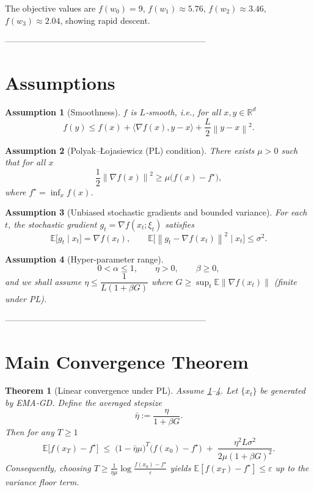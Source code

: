 \documentclass{article}
\newtheorem{assumption}{Assumption}
\newtheorem{theorem}{Theorem}
\newcommand{\EE}{\mathbb{E}}
\newcommand{\norm}[1]{\left\lVert #1\right\rVert}
\newcommand{\grad}{\nabla}
\begin{document}
The objective values are $f(w_{0})=9$, $f(w_{1})\approx5.76$, $f(w_{2})\approx3.46$, $f(w_{3})\approx2.04$, showing rapid descent.

-----------------------------------------------------------------------

\section*{Assumptions}
\begin{assumption}[Smoothness]\label{ass:smooth}
$f$ is $L$‑smooth, i.e., for all $x,y\in\mathbb{R}^{d}$
\[
    f(y)\le f(x)+\langle\grad f(x),y-x\rangle+\frac{L}{2}\norm{y-x}^{2}.
\]
\end{assumption}

\begin{assumption}[Polyak–Łojasiewicz (PL) condition]\label{ass:pl}
There exists $\mu>0$ such that for all $x$
\[
    \frac{1}{2}\norm{\grad f(x)}^{2}\ge \mu\bigl(f(x)-f^{\star}\bigr),
\]
where $f^{\star}= \inf_{x}f(x)$.
\end{assumption}

\begin{assumption}[Unbiased stochastic gradients and bounded variance]\label{ass:stoch}
For each $t$, the stochastic gradient $g_{t}= \grad f(x_{t};\xi_{t})$ satisfies
\[
    \EE\!\bigl[g_{t}\mid x_{t}\bigr]=\grad f(x_{t}),\qquad
    \EE\!\bigl[\norm{g_{t}-\grad f(x_{t})}^{2}\mid x_{t}\bigr]\le\sigma^{2}.
\]
\end{assumption}

\begin{assumption}[Hyper‑parameter range]\label{ass:hyper}
\[
    0<\alpha\le 1,\qquad \eta>0,\qquad \beta\ge 0,
\]
and we shall assume $\eta\le \dfrac{1}{L(1+\beta G)}$ where $G\ge \sup_{t}\EE\norm{\grad f(x_{t})}$ (finite under PL).
\end{assumption}

-----------------------------------------------------------------------

\section*{Main Convergence Theorem}
\begin{theorem}[Linear convergence under PL]\label{thm:linear}
Assume \ref{ass:smooth}–\ref{ass:hyper}. Let $\{x_{t}\}$ be generated by EMA‑GD. Define the averaged stepsize
\[
    \bar\eta:=\frac{\eta}{1+\beta G}.
\]
Then for any $T\ge 1$
\[
    \EE\!\bigl[f(x_{T})-f^{\star}\bigr]\;\le\;
    \bigl(1-\bar\eta\mu\bigr)^{T}\bigl(f(x_{0})-f^{\star}\bigr)
    \;+\;
    \frac{\eta^{2}L\sigma^{2}}{2\mu(1+\beta G)^{2}}.
\tag{1}
\]
Consequently, choosing $T\ge \frac{1}{\bar\eta\mu}\log\frac{f(x_{0})-f^{\star}}{\varepsilon}$ yields $\EE[f(x_{T})-f^{\star}]\le\varepsilon$ up to the variance floor term.
\end{theorem}
\end{document}
